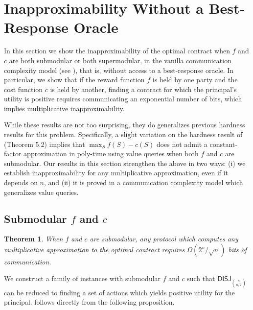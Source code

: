 \documentclass[11pt]{article}
\newtheorem{theorem}{Theorem}
\newcommand{\DISJ}[1]{\mathsf{DISJ}_{#1}}
\begin{document}



\appendix

\section{Inapproximability Without a Best-Response Oracle}\label{sec:CC_inapprox}
In this section we show the inapproximability of the optimal contract when $f$ and $c$ are both submodular or both supermodular, in the vanilla communication complexity model (see ), that is, without access to a best-response oracle.
In particular, we show that if the reward function $f$ is held by one party and the cost function $c$ is held by another, finding a contract for which the principal's utility is positive requires communicating an exponential number of bits, which implies multiplicative inapproximability. 

While these results are not too surprising, they do generalizes previous hardness results for this problem.
Specifically, a slight variation on the hardness result of \cite{iyer2012algorithms} (Theorem 5.2) implies that $\max_S f(S)-c(S)$ does not admit a constant-factor approximation in poly-time using value queries when both $f$ and $c$ are submodular. 
Our results in this section strengthen the above in two ways: (i) we establish inapproximability for any multiplicative approximation, even if it depends on $n$, 
and (ii) it is proved in a communication complexity model which generalizes value queries.

\subsection{Submodular $f$ and $c$} 
\begin{theorem}\label{thm:cc_inapprox_sub_sub}
    When $f$ and $c$ are submodular, any protocol which computes any multiplicative approximation to the optimal contract requires $\Omega(2^n/\sqrt{n})$ bits of communication.
\end{theorem}

We construct a family of instances with submodular $f$ and $c$ such that $\DISJ{\binom{n}{n/2}}$ can be reduced to finding a set of actions which yields positive utility for the principal.
 follows directly from the following proposition.
\end{document}
